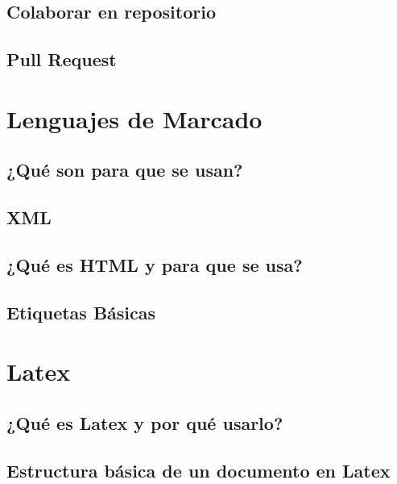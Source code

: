 \documentclass[11pt,letterpaper]{article}
\begin{document}
\subsection{Colaborar en repositorio}
\subsection{Pull Request}
\section{Lenguajes de Marcado}
\subsection{¿Qué son para que se usan?}
\subsection{XML}
\subsection{¿Qué es HTML y para que se usa?}
\subsection{Etiquetas Básicas}
\section{Latex}
\subsection{¿Qué es Latex y por qué usarlo?}
\subsection{Estructura básica de un documento en Latex}
\end{document}
